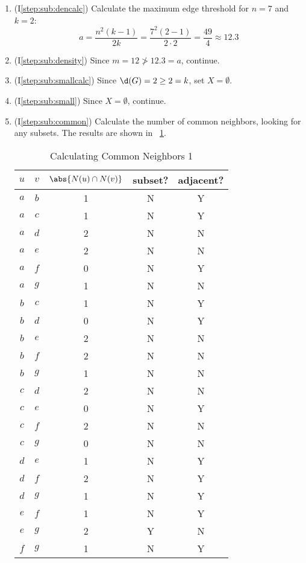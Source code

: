\begin{enumerate}
\item (I\ref{step:sub:dencalc}) Calculate the maximum edge threshold for \(n=7\) and \(k=2\):
  \[a=\frac{n^2(k-1)}{2k}=\frac{7^2(2-1)}{2\cdot2}=\frac{49}{4}\approx12.3\]

\item (I\ref{step:sub:density}) Since \(m=12\ngtr12.3=a\), continue.

\item (I\ref{step:sub:smallcalc}) Since \(\d(G)=2\ge2=k\), set \(X=\emptyset\).

\item (I\ref{step:sub:small}) Since \(X=\emptyset\), continue.

\item (I\ref{step:sub:common}) Calculate the number of common neighbors, looking for any subsets.  The results are
  shown in \tablename~\ref{tab:common1}.

  \begin{table}[H]
    \centering
    \caption{Calculating Common Neighbors 1}
    \label{tab:common1}
    \begin{tabular}{|c|c|c|c|c|}
      \hline
      \(u\) & \(v\) & \(\abs{N(u)\cap N(v)}\) & subset? & adjacent? \\
      \hline
      \(a\) & \(b\) & 1 & N & Y \\
      \hline
      \(a\) & \(c\) & 1 & N & Y \\
      \hline
      \(a\) & \(d\) & 2 & N & N \\
      \hline
      \(a\) & \(e\) & 2 & N & N \\
      \hline
      \(a\) & \(f\) & 0 & N & Y \\
      \hline
      \(a\) & \(g\) & 1 & N & N \\
      \hline
      \(b\) & \(c\) & 1 & N & Y \\
      \hline
      \(b\) & \(d\) & 0 & N & Y \\
      \hline
      \(b\) & \(e\) & 2 & N & N \\
      \hline
      \(b\) & \(f\) & 2 & N & N \\
      \hline
      \(b\) & \(g\) & 1 & N & N \\
      \hline
      \(c\) & \(d\) & 2 & N & N \\
      \hline
      \(c\) & \(e\) & 0 & N & Y \\
      \hline
      \(c\) & \(f\) & 2 & N & N \\
      \hline
      \(c\) & \(g\) & 0 & N & N \\
      \hline
      \(d\) & \(e\) & 1 & N & Y \\
      \hline
      \(d\) & \(f\) & 2 & N & Y \\
      \hline
      \(d\) & \(g\) & 1 & N & Y \\
      \hline
      \(e\) & \(f\) & 1 & N & Y \\
      \hline
      \(e\) & \(g\) & 2 & Y & N \\
      \hline
      \(f\) & \(g\) & 1 & N & Y \\
      \hline
    \end{tabular}
  \end{table}


\end{enumerate}
